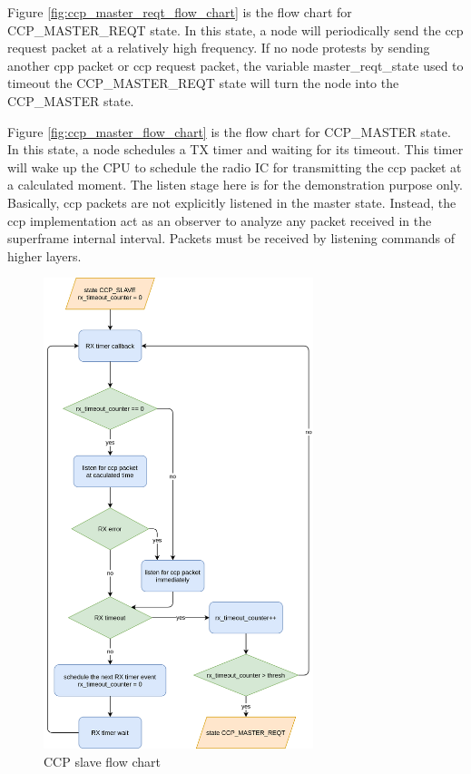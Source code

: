 \documentclass[\main/main.tex]{subfiles}
\begin{document}
Figure \ref{fig:ccp_master_reqt_flow_chart} is the flow chart for
CCP\_MASTER\_REQT state. In this state, a node will periodically send the ccp request packet at a relatively high frequency. If no node protests by sending another cpp packet or ccp request packet, the variable master\_reqt\_state used to timeout the CCP\_MASTER\_REQT state will turn the node into the CCP\_MASTER state.

Figure \ref{fig:ccp_master_flow_chart} is the flow chart for CCP\_MASTER state. In this state, a node schedules a TX timer and waiting for its timeout. This timer will wake up the CPU to schedule the radio IC for transmitting the ccp packet at a calculated moment. The listen stage here is for the demonstration purpose only. Basically, ccp packets are not explicitly listened in the master state. Instead, the ccp implementation act as an observer to analyze any packet received in the superframe internal interval. Packets must be received by listening commands of higher layers.

\begin{figure}[H]
    \begin{center}
        \includegraphics[width=0.7\textwidth]{ccp_slave_flow_chart.png}
    \end{center}
    \caption{CCP slave flow chart}
    \label{fig:ccp_slave_flow_chart}
\end{figure}
\end{document}
